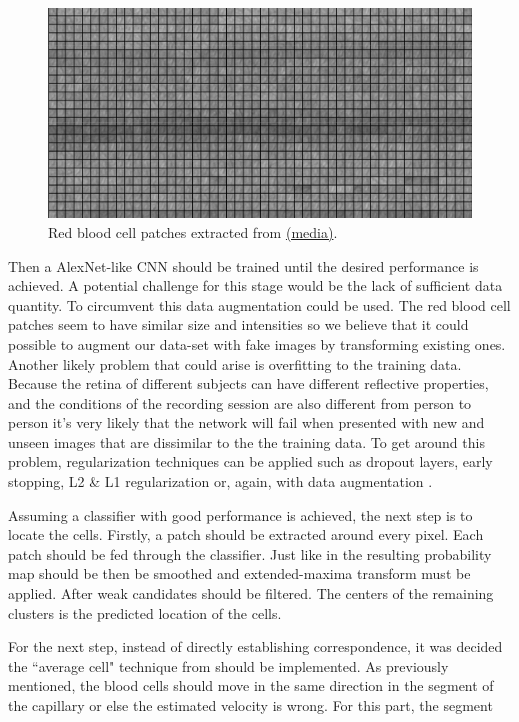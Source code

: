 \documentclass[]{article}
\begin{document}
\begin{figure}[ht]
	\centering
	\includegraphics[width=\textwidth]{extracting_data_own.png}
	\caption{Red blood cell patches extracted from \href{https://youtu.be/-7ew5sqOaTo}{(media)}. }
	\label{fig:own-data-blood-cells}
\end{figure}

Then a AlexNet\cite{krizhevsky_imagenet_2012}-like CNN should be trained until the desired performance is achieved.
A potential challenge for this stage would be the lack of sufficient data quantity.
To circumvent this data augmentation could be used.
The red blood cell patches seem to have similar size and intensities so we believe that it could possible to augment our data-set with fake images by transforming existing ones.
Another likely problem that could arise is overfitting to the training data.
Because the retina of different subjects can have different reflective properties, and the conditions of the recording session are also different from
person to person it's very likely that the network will fail when presented with
new and unseen images that are dissimilar to the the training data.
To get around this problem, regularization techniques can be applied such as dropout layers, early stopping, L2 \& L1 regularization\cite{Goodfellow-et-al-2016} or, again, with data augmentation\cite{Goodfellow-et-al-2016} . 

Assuming a classifier with good performance is achieved, the next step is to 
locate the cells.
Firstly, a patch should be extracted around every pixel. Each patch should be 
fed through the classifier.
Just like in \cite{cunefare_open_2017} the resulting probability map should be then be smoothed and extended-maxima transform must be applied.
After weak candidates should be filtered.
The centers of the remaining clusters is the predicted location of the cells.

For the next step, instead of directly establishing correspondence,
it was decided the ``average cell" technique from\cite{castro_rapid_2016}
should be implemented.
As previously mentioned, the blood cells should move in the same direction in
the segment of the capillary or else the estimated velocity is wrong.
For this part, the segment 
\end{document}
